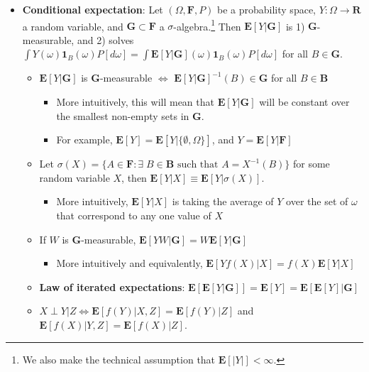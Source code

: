 \documentclass[12pt,english]{article}
\begin{document}
\begin{itemize}
	\item \textbf{Conditional expectation}: Let $(\Omega, \mathbf{F}, P)$ be a probability space, $Y : \Omega \to \mathbf{R}$ a random variable, and $\mathbf{G} \subset \mathbf{F}$ a $\sigma$-algebra.\footnote{We also make the technical assumption that $\mathbf{E}[|Y|] < \infty$.} Then $\mathbf{E}[Y | \mathbf{G}]$ is 1) $\mathbf{G}$-measurable, and 2) solves $\int Y(\omega) \mathbf{1}_{B}(\omega) P[d\omega] = \int \mathbf{E}[Y | \mathbf{G}](\omega) \mathbf{1}_{B}(\omega) P[d \omega]$ for all $B \in \mathbf{G}$.
	\begin{itemize}
		\item $\mathbf{E}[Y | \mathbf{G}]$ is $\mathbf{G}$-measurable $\Leftrightarrow$ $\mathbf{E}[Y | \mathbf{G}]^{-1}(B) \in \mathbf{G}$ for all $B \in \mathbf{B}$
		\begin{itemize}
			\item More intuitively, this will mean that $\mathbf{E}[Y | \mathbf{G}]$ will be constant over the smallest non-empty sets in $\mathbf{G}$.
			\item For example, $\mathbf{E}[Y] = \mathbf{E}[Y | \{ \emptyset, \Omega \}]$, and $Y = \mathbf{E}[Y | \mathbf{F}]$
		\end{itemize}
		\item Let $\sigma(X) = \{ A \in \mathbf{F} : \exists \; B \in \mathbf{B} \text{ such that } A = X^{-1}(B) \}$ for some random variable $X$, then $\mathbf{E}[Y | X] \equiv \mathbf{E}[Y | \sigma(X)]$.
		\begin{itemize}
			\item More intuitively, $\mathbf{E}[Y | X]$ is taking the average of $Y$ over the set of $\omega$ that correspond to any one value of $X$
		\end{itemize}
		\item If $W$ is $\mathbf{G}$-measurable, $\mathbf{E}[YW | \mathbf{G}] = W \mathbf{E}[Y | \mathbf{G}]$
		\begin{itemize}
			\item More intuitively and equivalently, $\mathbf{E}[Y f(X) | X] = f(X) \mathbf{E}[Y | X]$
		\end{itemize}
		\item \textbf{Law of iterated expectations}: $\mathbf{E}[\mathbf{E}[Y | \mathbf{G}]] = \mathbf{E}[Y] = \mathbf{E}[\mathbf{E}[Y] | \mathbf{G}]$
		\item $X \perp Y | Z \Leftrightarrow \mathbf{E}[f(Y) | X, Z] = \mathbf{E}[f(Y) | Z]$ and $\mathbf{E}[f(X) | Y, Z] = \mathbf{E}[f(X) | Z]$.

\end{itemize}
\end{itemize}
\end{document}
